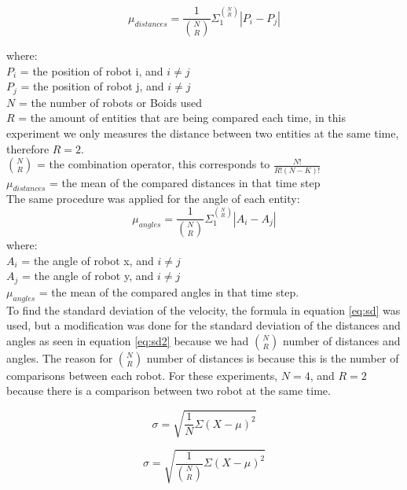 \begin{equation}
\mu_{distances} = \frac{1}{ {N \choose R}} \Sigma_1^{N \choose R} | P_i - P_j |
\end{equation}

where:
\\
$P_i$ = the position of robot i, and $i \neq j$
\\
$P_j$ = the position of robot j, and $i \neq j$
\\
$N$ = the number of robots or Boids used
\\
$R$ = the amount of entities that are being compared each time, in this experiment we only measures the distance between two entities at the same time, therefore $R = 2$.
\\
$N \choose R$ = the combination operator, this corresponds to $ \frac{N!}{R! (N-K)!}$
\\
$\mu_{distances}$ = the mean of the compared distances in that time step
\\

The same procedure was applied for the angle of each entity: 
\begin{equation}
\mu_{angles} = \frac{1}{ {N \choose R}} \Sigma_1^{N \choose R} | A_i - A_j |
\end{equation}
where:
\\
$A_i$ = the angle of robot x, and $i \neq j$
\\
$A_j$ = the angle of robot y, and $i \neq j$
\\
$\mu_{angles}$ = the mean of the compared angles in that time step.
\\

To find the standard deviation of the velocity, the formula in equation \ref{eq:sd} was used, but a modification was done for the standard deviation of the distances and angles as seen in equation \ref{eq:sd2} because we had $ {N \choose R}$ number of distances and angles. The reason for $ {N \choose R}$ number of distances is because this is the number of comparisons between each robot. For these experiments, $N = 4$, and $R = 2$ because there is a comparison between two robot at the same time.


\begin{equation}
\label{eq:sd}
\sigma =  \sqrt{\frac{1}{N}\Sigma(X-\mu)^2}
\end{equation}

\begin{equation}
\label{eq:sd2}
\sigma =  \sqrt{\frac{1}{{N \choose R}}\Sigma(X-\mu)^2}
\end{equation}




